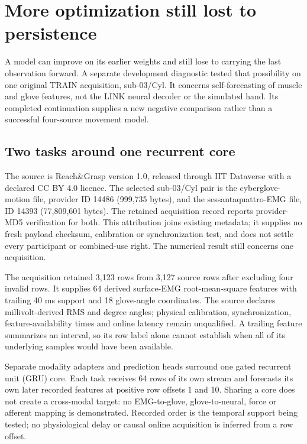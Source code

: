 \section{More optimization still lost to persistence}
\label{sec:self-forecast}

A model can improve on its earlier weights and still lose to carrying the last observation forward. A separate development diagnostic tested that possibility on one original TRAIN acquisition, sub-03/Cyl. It concerns self-forecasting of muscle and glove features, not the LINK neural decoder or the simulated hand. Its completed continuation supplies a new negative comparison rather than a successful four-source movement model.\cite{movementTrain990Recorded2026}

\subsection{Two tasks around one recurrent core}
The source is Reach\&Grasp version 1.0, released through IIT Dataverse with a declared CC BY 4.0 licence.\cite{reachGraspV1} The selected sub-03/Cyl pair is the cyberglove-motion file, provider ID 14486 (999,735 bytes), and the sessantaquattro-EMG file, ID 14393 (77,809,601 bytes). The retained acquisition record reports provider-MD5 verification for both. This attribution joins existing metadata; it supplies no fresh payload checksum, calibration or synchronization test, and does not settle every participant or combined-use right. The numerical result still concerns one acquisition.

The acquisition retained 3,123 rows from 3,127 source rows after excluding four invalid rows. It supplies 64 derived surface-EMG root-mean-square features with trailing 40 ms support and 18 glove-angle coordinates. The source declares millivolt-derived RMS and degree angles; physical calibration, synchronization, feature-availability times and online latency remain unqualified. A trailing feature summarizes an interval, so its row label alone cannot establish when all of its underlying samples would have been available.

Separate modality adapters and prediction heads surround one gated recurrent unit (GRU) core. Each task receives 64 rows of its own stream and forecasts its own later recorded features at positive row offsets 1 and 10. Sharing a core does not create a cross-modal target: no EMG-to-glove, glove-to-neural, force or afferent mapping is demonstrated. Recorded order is the temporal support being tested; no physiological delay or causal online acquisition is inferred from a row offset.

